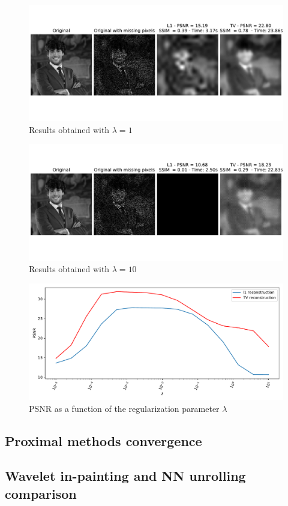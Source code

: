 \documentclass[12pt]{article}
\begin{document}
\begin{figure}
    \centering
    \includegraphics[width=17cm]{hw3/codes/exercise2/results/lambda_search/me_1.pdf}
    \caption{Results obtained with $\lambda = 1$}
    \label{fig:lambda-search-1}
\end{figure}

\begin{figure}
    \centering
    \includegraphics[width=17cm]{hw3/codes/exercise2/results/lambda_search/me_10.pdf}
    \caption{Results obtained with $\lambda = 10$}
    \label{fig:lambda-search-10}
\end{figure}

\begin{figure}
    \centering
    \includegraphics[width=17cm]{hw3/codes/exercise2/results/lambda_search/lambda_search.pdf}
    \caption{PSNR as a function of the regularization parameter $\lambda$}
    \label{fig:lambda-search}
\end{figure}

\subsection{Proximal methods convergence}

\subsection{Wavelet in-painting and NN unrolling comparison}
\end{document}
